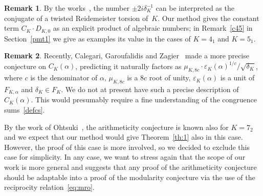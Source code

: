 \documentclass[11pt]{amsart}
\newcommand{\eps}{\varepsilon}
\theoremstyle{definition}
\newtheorem{remark}{Remark}
\newcommand{\1}{{\mathbf 1}}
\numberwithin{equation}{section}
\begin{document}
\begin{remark}
By the works~\cite{OhtsukiTakata2015,Ohtsuki52,OhtsukiYokota6,Ohtsuki7}, the number $\pm 2i \delta_K^{-1}$ can be interpreted as the conjugate of a twisted Reidemeister torsion of~$K$. Our method gives the constant term $C_K\cdot D_{K,0}$ as an explicit product of algebraic numbers; in Remark~\ref{c45} in Section~\ref{pmt1} we give as examples its value in the cases of $K=4_1$ and $K=5_1$.
\end{remark}
\begin{remark}
Recently, Calegari, Garoufalidis and Zagier~\cite{CalegariGaroufalidisZagier} made a more precise conjecture on $C_K(\alpha)$, predicting it naturally factors as $\mu_{K,8c}\cdot \eps_K(\alpha)^{1/c}/\sqrt{\delta_K}$, where $c$ is the denominator of $\alpha$, $\mu_{K,8c}$ is a $8c$ root of unity, $\eps_K(\alpha)$ is a unit of $F_{K,\alpha}$ and $\delta_K\in F_{K}$. We do not at present have such a precise description of~$C_K(\alpha)$. This would presumably require a fine understanding of the congruence sums~\eqref{defcs}.
\end{remark}
%
By the work of Ohtsuki~\cite{Ohtsuki7}, the arithmeticity conjecture is known also for $K=7_2$ and we expect that our method would give Theorem~\ref{th:1} also in this case. However, the proof of this case is more involved, so we decided to exclude this case for simplicity. In any case, we want to stress again that the scope of our work is more general and suggests that any proof of the arithmeticity conjecture should be adaptable into a proof of the modularity conjecture via the use of the reciprocity relation~\eqref{eq:mro}.

\medskip
\end{document}
